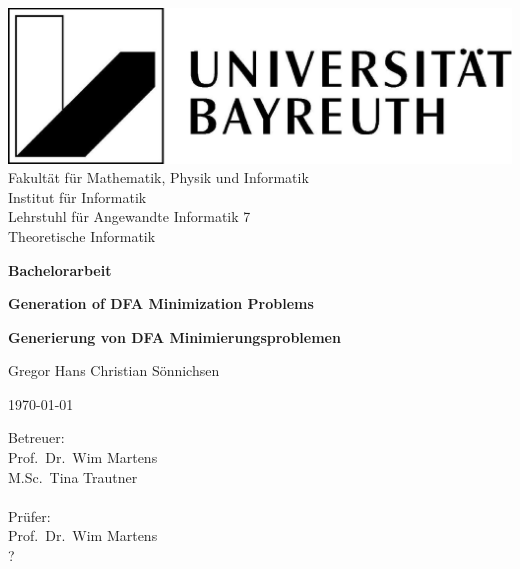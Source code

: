 \documentclass[a4paper, oneside, 11pt]{book}
\theoremstyle{definition}
\theoremstyle{remark}
\begin{document}
	
	\frontmatter
	
	\begin{titlepage}
		{
			\raggedright
			\includegraphics[scale=0.1]{images/UBT-logo.jpg}\\
			\small{
			Fakultät für Mathematik, Physik und Informatik\\
			Institut für Informatik\\
			Lehrstuhl für Angewandte Informatik 7\\
			Theoretische Informatik}\\
			\vspace{1cm}	
		}
		{\centering\bfseries\Large Bachelorarbeit\par}
		\vspace{1cm}
		{\centering\huge\bfseries Generation of DFA Minimization Problems\par}
		\vspace{0.7cm}
		{\centering\large\bfseries Generierung von DFA Minimierungsproblemen\par}
		\vspace{2cm}
		{\centering\large Gregor Hans Christian Sönnichsen\par}
		\vspace{0.4cm}
		{\centering\large \today\par}
		\vfill
		{\large\raggedright
			Betreuer:\\
			Prof.\ Dr.\ Wim Martens\\
			M.Sc.\ Tina Trautner\\
			$ $\\
			Prüfer:\\
			Prof.\ Dr.\ Wim Martens\\
			?\par
		}
	\end{titlepage}
	
	
	
	
\end{document}
